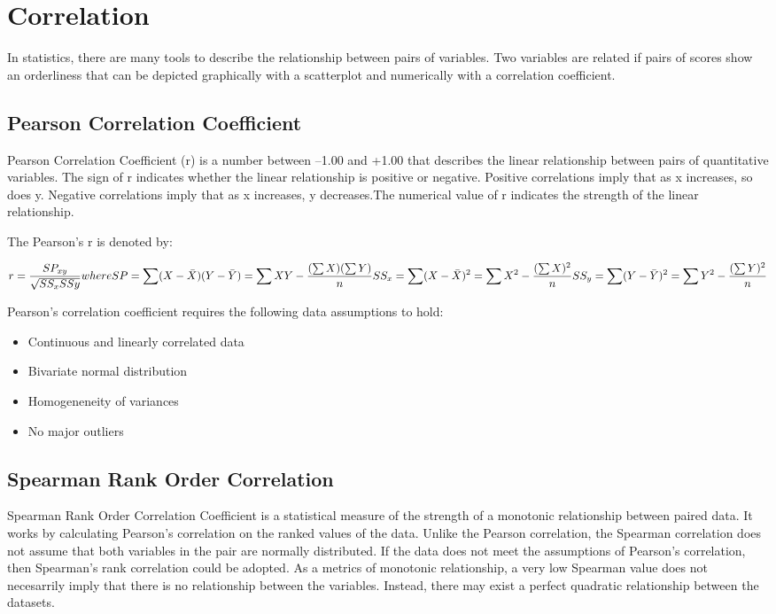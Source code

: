 \section{Correlation}
In statistics, there are many tools to describe the relationship between pairs of variables. Two variables are related if pairs of scores show an orderliness that can be depicted graphically with a scatterplot and numerically with a correlation coefficient.

\subsection{Pearson Correlation Coefficient}
Pearson Correlation Coefficient (r) is a number between –1.00 and +1.00 that describes the linear relationship between pairs of quantitative variables. The sign of r indicates whether the linear relationship is positive or negative. Positive correlations imply that as x increases, so does y. Negative correlations imply that as x increases, y decreases.The numerical value of r indicates the strength of the linear relationship.

The Pearson's r is denoted by:

\begin{equation}
r = \frac{SP_{xy}}{\sqrt{SS_{x}SS{y}}}\\
where SP = \sum(X-\bar{X})(Y-\bar{Y}) = \sum XY - \frac{(\sum X)(\sum Y)}{n}\\
SS_{x} = \sum (X - \bar{X})^{2} = \sum X^{2} - \frac{(\sum X)^{2}}{n}
SS_{y} = \sum (Y - \bar{Y})^{2} = \sum Y^{2} - \frac{(\sum Y)^{2}}{n}
\label{eq: correlation coefficient}
\end{equation}

Pearson's correlation coefficient requires the following data assumptions to hold:
\begin{itemize}
	\item Continuous and linearly correlated data
	\item Bivariate normal distribution
	\item Homogeneneity of variances
	\item No major outliers
\end{itemize}

\subsection{Spearman Rank Order Correlation}
Spearman Rank Order Correlation Coefficient is a statistical measure of the strength of a monotonic relationship between paired data. It works by calculating Pearson’s correlation on the ranked values of the data. Unlike the Pearson correlation, the Spearman correlation does not assume that both variables in the pair are normally distributed. If the data does not meet the assumptions of Pearson's correlation, then Spearman’s rank correlation could be adopted. As a metrics of monotonic relationship, a very low Spearman value does not necesarrily imply that there is no relationship between the variables. Instead, there may exist a perfect quadratic relationship between the datasets.

